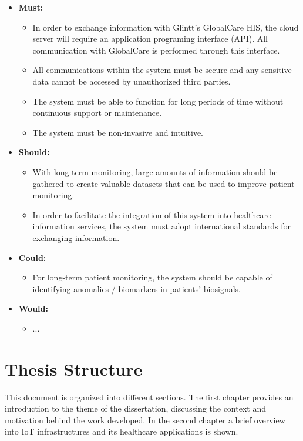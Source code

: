 \begin{itemize}
    \item \textbf{Must:}
    \begin{itemize}
        \item In order to exchange information with Glintt's GlobalCare HIS, the cloud server will require an application programing interface (\acs{API}). All communication with GlobalCare is performed through this interface. 
        \item All communications within the system must be secure and any sensitive data cannot be accessed by unauthorized third parties.
        \item The system must be able to function for long periods of time without continuous support or maintenance.
        \item The system must be non-invasive and intuitive.
    \end{itemize}
    \item \textbf{Should:}
    \begin{itemize}   
        \item With long-term monitoring, large amounts of information should be gathered to create valuable datasets that can be used to improve patient monitoring.
        \item In order to facilitate the integration of this system into healthcare information services, the system must adopt international standards for exchanging information.
    \end{itemize}
    \item \textbf{Could:}
    \begin{itemize}
        \item For long-term patient monitoring, the system should be capable of identifying anomalies / biomarkers in patients' biosignals.
    \end{itemize}
    \item \textbf{Would:}
    \begin{itemize}
        \item ...
    \end{itemize}
\end{itemize}

\section{Thesis Structure}

This document is organized into different sections. The first chapter provides an introduction to the theme of the dissertation, discussing the context and motivation behind the work developed. In the second chapter a brief overview into \acs{IoT} infrastructures and its healthcare applications is shown. 